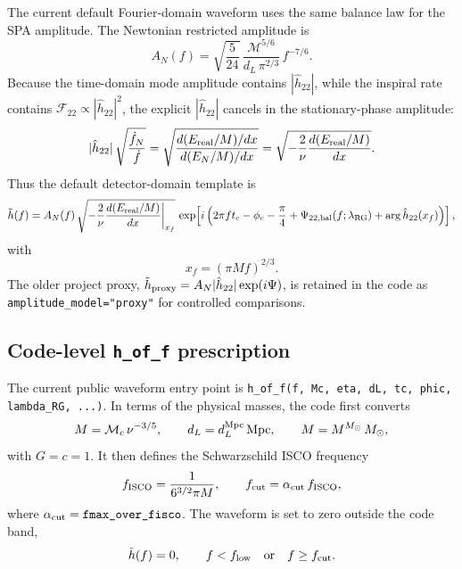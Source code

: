\documentclass[11pt]{article}
\begin{document}
The current default Fourier-domain waveform uses the same balance law for the
SPA amplitude. The Newtonian restricted amplitude is
\begin{equation}
  A_N(f)
  =
  \sqrt{\frac{5}{24}}\,
  \frac{\mathcal M^{5/6}}{d_L\,\pi^{2/3}}\,
  f^{-7/6}.
\end{equation}
Because the time-domain mode amplitude contains
\(|\hat h_{22}|\), while the inspiral rate contains
\(\mathcal F_{22}\propto |\hat h_{22}|^2\), the explicit
\(|\hat h_{22}|\) cancels in the stationary-phase amplitude:
\begin{equation}
  |\hat h_{22}|\,
  \sqrt{\frac{\dot f_N}{\dot f}}
  =
  \sqrt{
    \frac{d(E_{\rm real}/M)/dx}{d(E_N/M)/dx}
  }
  =
  \sqrt{
    -\frac{2}{\nu}\frac{d(E_{\rm real}/M)}{dx}
  }.
\end{equation}
Thus the default detector-domain template is
\begin{equation}
  \tilde h(f)
  =
  A_N(f)\,
  \sqrt{
    -\frac{2}{\nu}\frac{d(E_{\rm real}/M)}{dx}\bigg|_{x_f}
  }\,
  \exp\!\left[
    i\left(
      2\pi f t_c - \phi_c - \frac{\pi}{4}
      + \Psi_{22,{\rm bal}}(f;\lambda_{\rm RG})
      + \arg \hat h_{22}(x_f)
    \right)
  \right],
\end{equation}
with
\begin{equation}
  x_f = (\pi M f)^{2/3}.
\end{equation}
The older project proxy,
\(\tilde h_{\rm proxy}=A_N|\hat h_{22}|\exp(i\Psi)\), is retained in the code
as \texttt{amplitude\_model="proxy"} for controlled comparisons.

\subsection{Code-level \texttt{h\_of\_f} prescription}

The current public waveform entry point is
\texttt{h\_of\_f(f, Mc, eta, dL, tc, phic, lambda\_RG, ...)}. In terms of
the physical masses, the code first converts
\begin{equation}
  M = \mathcal M_c\,\nu^{-3/5},
  \qquad
  d_L = d_L^{\rm Mpc}\,{\rm Mpc},
  \qquad
  M = M^{M_\odot}\,M_\odot,
\end{equation}
with \(G=c=1\). It then defines the Schwarzschild ISCO frequency
\begin{equation}
  f_{\rm ISCO}
  =
  \frac{1}{6^{3/2}\pi M},
  \qquad
  f_{\rm cut}
  =
  \alpha_{\rm cut}\,f_{\rm ISCO},
\end{equation}
where \(\alpha_{\rm cut}=\texttt{fmax\_over\_fisco}\). The waveform is set to
zero outside the code band,
\begin{equation}
  \tilde h(f)=0,
  \qquad
  f<f_{\rm low}
  \quad\hbox{or}\quad
  f\ge f_{\rm cut}.
\end{equation}
\end{document}
